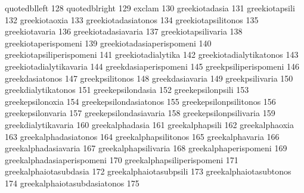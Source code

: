  quotedblleft                      128
 quotedblright                     129
 exclam                            130
 greekiotadasia                    131
 greekiotapsili                    132
 greekiotaoxia                     133
 greekiotadasiatonos               134
 greekiotapsilitonos               135
 greekiotavaria                    136
 greekiotadasiavaria               137
 greekiotapsilivaria               138
 greekiotaperispomeni              139
 greekiotadasiaperispomeni         140
 greekiotapsiliperispomeni         141
 greekiotadialytika                142
 greekiotadialytikatonos           143
 greekiotadialytikavaria           144
 greekdasiaperispomeni             145
 greekpsiliperispomeni             146
 greekdasiatonos                   147
 greekpsilitonos                   148
 greekdasiavaria                   149
 greekpsilivaria                   150
 greekdialytikatonos               151
 greekepsilondasia                 152
 greekepsilonpsili                 153
 greekepsilonoxia                  154
 greekepsilondasiatonos            155
 greekepsilonpsilitonos            156
 greekepsilonvaria                 157
 greekepsilondasiavaria            158
 greekepsilonpsilivaria            159
 greekdialytikavaria	           160
 greekalphadasia                   161
 greekalphapsili                   162
 greekalphaoxia                    163
 greekalphadasiatonos              164
 greekalphapsilitonos              165
 greekalphavaria                   166
 greekalphadasiavaria              167
 greekalphapsilivaria              168
 greekalphaperispomeni             169
 greekalphadasiaperispomeni        170
 greekalphapsiliperispomeni        171
 greekalphaiotasubdasia            172
 greekalphaiotasubpsili            173
 greekalphaiotasubtonos            174
 greekalphaiotasubdasiatonos       175
